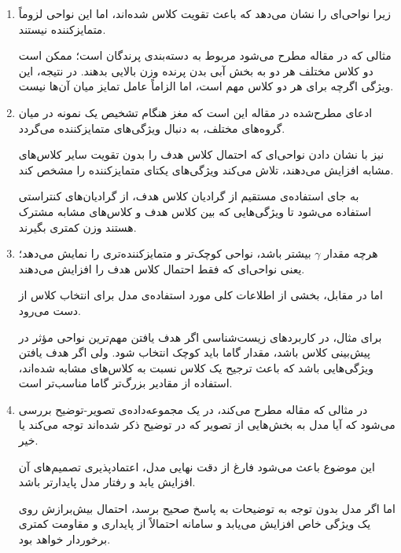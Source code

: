 \begin{enumerate}
	
	\item 
	زیرا 
	نواحی‌ای را نشان می‌دهد که باعث تقویت کلاس شده‌اند، اما این نواحی لزوماً متمایزکننده نیستند. 
	
	مثالی که در مقاله مطرح می‌شود مربوط به دسته‌بندی پرندگان است؛ ممکن است دو کلاس مختلف هر دو به بخش آبی بدن پرنده وزن بالایی بدهند. در نتیجه، این ویژگی اگرچه برای هر دو کلاس مهم است، اما الزاماً عامل تمایز میان آن‌ها نیست.
	
	\item 
	ادعای مطرح‌شده در مقاله این است که مغز هنگام تشخیص یک نمونه در میان گروه‌های مختلف، به دنبال ویژگی‌های متمایزکننده می‌گردد. 
	
	نیز با نشان دادن نواحی‌ای که احتمال کلاس هدف را بدون تقویت سایر کلاس‌های مشابه افزایش می‌دهند، تلاش می‌کند ویژگی‌های یکتای متمایزکننده را مشخص کند. 
	
	به جای استفاده‌ی مستقیم از گرادیان کلاس هدف، از گرادیان‌های کنتراستی استفاده می‌شود تا ویژگی‌هایی که بین کلاس هدف و کلاس‌های مشابه مشترک هستند وزن کمتری بگیرند.
	
	\item 
	هرچه مقدار 
	$\gamma$
	بیشتر باشد، 
	نواحی کوچک‌تر و متمایزکننده‌تری را نمایش می‌دهد؛ یعنی نواحی‌ای که فقط احتمال کلاس هدف را افزایش می‌دهند. 
	
	اما در مقابل، بخشی از اطلاعات کلی مورد استفاده‌ی مدل برای انتخاب کلاس از دست می‌رود.
	
	برای مثال، در کاربردهای زیست‌شناسی اگر هدف یافتن مهم‌ترین نواحی مؤثر در پیش‌بینی کلاس باشد، مقدار گاما باید کوچک انتخاب شود. ولی اگر هدف یافتن ویژگی‌هایی باشد که باعث ترجیح یک کلاس نسبت به کلاس‌های مشابه شده‌اند، استفاده از مقادیر بزرگ‌تر گاما مناسب‌تر است.
	
	\item 
	در مثالی که مقاله مطرح می‌کند، در یک مجموعه‌داده‌ی تصویر-توضیح بررسی می‌شود که آیا مدل به بخش‌هایی از تصویر که در توضیح ذکر شده‌اند توجه می‌کند یا خیر. 
	
	این موضوع باعث می‌شود فارغ از دقت نهایی مدل، اعتمادپذیری تصمیم‌های آن افزایش یابد و رفتار مدل پایدارتر باشد. 
	
	اما اگر مدل بدون توجه به توضیحات به پاسخ صحیح برسد، احتمال بیش‌برازش روی یک ویژگی خاص افزایش می‌یابد و سامانه احتمالاً از پایداری و مقاومت کمتری برخوردار خواهد بود.
	
\end{enumerate}

